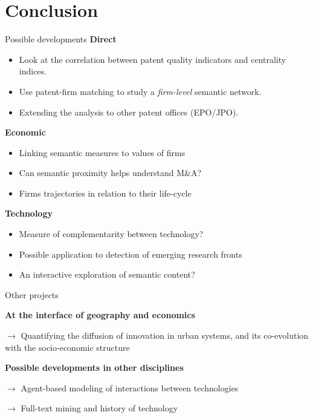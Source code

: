 \documentclass{beamer}
\begin{document}
\section{Conclusion}
\begin{frame}{Possible developments}
\textbf{Direct}
    \begin{itemize}
        \item Look at the correlation between patent quality indicators and centrality indices.
        \item Use patent-firm matching to study a \emph{firm-level} semantic network.
        \item Extending the analysis to other patent offices (EPO/JPO).
    \end{itemize}
    \pause
\textbf{Economic}
    \begin{itemize}
        \item Linking semantic measures to values of firms
        \item Can semantic proximity helps understand M\&A?
        \item Firms trajectories in relation to their life-cycle
    \end{itemize}
    \pause
\textbf{Technology}
\begin{itemize}
    \item Measure of complementarity between technology?
    \item Possible application to detection of emerging research fronts
    \item An interactive exploration of semantic content?
\end{itemize}
\end{frame}

\begin{frame}{Other projects}
     
     \textbf{At the interface of geography and economics}
     
     \smallskip
     
     $\rightarrow$ Quantifying the diffusion of innovation in urban systems, and its co-evolution with the socio-economic structure
     
     \smallskip
     
     \bigskip
     
     \textbf{Possible developments in other disciplines}
     
      \smallskip
     
     $\rightarrow$ Agent-based modeling of interactions between technologies
     
     \smallskip
     
     $\rightarrow$ Full-text mining and history of technology \\

\end{frame}
\end{document}
